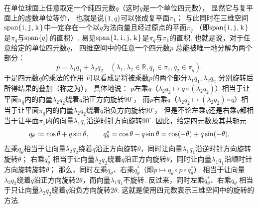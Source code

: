 在单位球面上任意取定一个纯四元数\(q\)（这时\(q\)是一个单位四元数），
显然它与复平面上的虚数单位等价，
也就是说\(\{1,q\}\)可以张成复平面\(\pi_1\)；
与此同时在三维空间\(\operatorname{span}\{\kern1pt\mathrm{i}\kern1pt,\kern1pt\mathrm{j}\kern1pt,\kern1pt\mathrm{k}\kern1pt\}\)中一定存在一个以\(q\)为法向量且经过原点的平面\(\pi_q\)
（即\(\operatorname{span}\{\kern1pt\mathrm{i}\kern1pt,\kern1pt\mathrm{j}\kern1pt,\kern1pt\mathrm{k}\kern1pt\}\)是\(\pi_q\)与\(\operatorname{span}\{q\}\)的直积）.
易见\(\operatorname{span}\{1,\kern1pt\mathrm{i}\kern1pt,\kern1pt\mathrm{j}\kern1pt,\kern1pt\mathrm{k}\kern1pt\}\)是\(\pi_q\)与\(\pi_1\)的直积.
也就是说，对于任意给定的单位四元数\(q\)，
四维空间中的任意一个四元数\(p\)
总能被唯一地分解为两个部分：\begin{equation*}
	p = \lambda_1 q_1 + \lambda_2 q_2
	\quad(
		\lambda_1,\lambda_2 \in \mathbb{R},
		q_1 \in \pi_1,
		q_2 \in \pi_q
	).
\end{equation*}
于是四元数\(q\)的乘法的作用
可以看成是将被乘数\(p\)的两个部分\(\lambda_1 q_1, \lambda_2 q_2\)
分别旋转后所得结果的叠加（称之为），
具体地说：
\(p\)左乘\(q\)（\(\lambda_2 q_2 \mapsto q \circ (\lambda_2 q_2)\)）相当于让平面\(\pi_q\)内的向量\(\lambda_2 q_2\)绕着\(q\)沿正方向旋转\(90^\circ\)，
而\(p\)右乘\(q\)（\(\lambda_2 q_2 \mapsto (\lambda_2 q_2) \circ q\)）相当于让平面\(\pi_q\)内的向量\(\lambda_2 q_2\)绕着\(q\)沿负方向旋转\(90^\circ\)，
但是不论左乘\(q\)还是右乘\(q\)都相当于让平面\(\pi_1\)内的向量\(\lambda_1 q_1\)沿逆时针方向旋转\(90^\circ\).
因此，给定四元数及其共轭元\begin{equation*}
	q_\theta := \cos\theta + q \sin\theta,
	\qquad
	q_\theta^* = \cos\theta - q \sin\theta = \cos(-\theta) + q \sin(-\theta),
\end{equation*}
左乘\(q_\theta\)相当于让向量\(\lambda_2 q_2\)绕着\(q\)沿正方向旋转\(\theta\)，同时让向量\(\lambda_1 q_1\)沿逆时针方向旋转旋转\(\theta\)；
右乘\(q_\theta^*\)
相当于让向量\(\lambda_2 q_2\)绕着\(q\)沿正方向旋转\(\theta\)，同时让向量\(\lambda_1 q_1\)沿顺时针方向旋转旋转\(\theta\)；
那么，同时左乘\(q_\theta\)、右乘\(q_\theta^*\)（即\(p \mapsto q_\theta \circ p \circ q_\theta^*\)）
相当于让向量\(\lambda_2 q_2\)绕着\(q\)沿正方向旋转\(2\theta\)，而向量\(\lambda_1 q_1\)不旋转.
反过来，同时左乘\(q_\theta^*\)、右乘\(q_\theta\)
相当于只让向量\(\lambda_2 q_2\)绕着\(q\)沿负方向旋转\(2\theta\).
这就是使用四元数表示三维空间中的旋转的方法.


